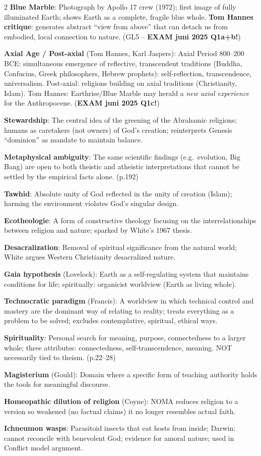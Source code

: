 \documentclass[a4paper,10pt]{article}
\begin{document}
\begin{multicols}{2}
\textbf{Blue Marble}: Photograph by Apollo 17 crew (1972); first image of fully illuminated Earth; shows Earth as a complete, fragile blue whole. \textbf{Tom Hannes critique}: generates abstract ``view from above'' that can detach us from embodied, local connection to nature. (GL5 -- \textbf{EXAM juni 2025 Q1a+b!})

\textbf{Axial Age / Post-axial} (Tom Hannes, Karl Jaspers): Axial Period 800--200 BCE: simultaneous emergence of reflective, transcendent traditions (Buddha, Confucius, Greek philosophers, Hebrew prophets): self-reflection, transcendence, universalism. Post-axial: religions building on axial traditions (Christianity, Islam). Tom Hannes: Earthrise/Blue Marble may herald a \textit{new axial experience} for the Anthropocene. (\textbf{EXAM juni 2025 Q1c!})

\textbf{Stewardship}: The central idea of the greening of the Abrahamic religions; humans as caretakers (not owners) of God's creation; reinterprets Genesis ``dominion'' as mandate to maintain balance.

\textbf{Metaphysical ambiguity}: The same scientific findings (e.g.\ evolution, Big Bang) are open to both theistic and atheistic interpretations that cannot be settled by the empirical facts alone. (p.192)

\textbf{Tawhid}: Absolute unity of God reflected in the unity of creation (Islam); harming the environment violates God's singular design.

\textbf{Ecotheologie}: A form of constructive theology focusing on the interrelationships between religion and nature; sparked by White's 1967 thesis.

\textbf{Desacralization}: Removal of spiritual significance from the natural world; White argues Western Christianity desacralized nature.

\textbf{Gaia hypothesis} (Lovelock): Earth as a self-regulating system that maintains conditions for life; spiritually: organicist worldview (Earth as living whole).

\textbf{Technocratic paradigm} (Francis): A worldview in which technical control and mastery are the dominant way of relating to reality; treats everything as a problem to be solved; excludes contemplative, spiritual, ethical ways.

\textbf{Spirituality}: Personal search for meaning, purpose, connectedness to a larger whole; three attributes: connectedness, self-transcendence, meaning. NOT necessarily tied to theism. (p.22--28)

\textbf{Magisterium} (Gould): Domain where a specific form of teaching authority holds the tools for meaningful discourse.

\textbf{Homeopathic dilution of religion} (Coyne): NOMA reduces religion to a version so weakened (no factual claims) it no longer resembles actual faith.

\textbf{Ichneumon wasps}: Parasitoid insects that eat hosts from inside; Darwin: cannot reconcile with benevolent God; evidence for amoral nature; used in Conflict model argument.
\end{multicols}
\end{document}
